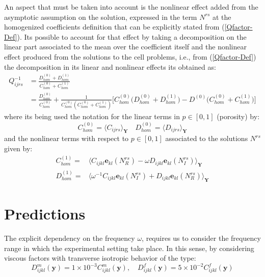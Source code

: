 An aspect that must be taken into account is the nonlinear effect added from the asymptotic assumption on the solution, expressed in the term $N^{rs}$ at the homogenized coefficients definition that can be explicitly stated from (\ref{Qfactor-Def}).
Its possible to account for that effect by taking a decomposition on the linear part associated to the mean over the coefficient itself and the nonlinear effect produced from the solutions to the cell problems, i.e., from (\ref{Qfactor-Def}) the decomposition in its linear and nonlinear effects its obtained as:
\begin{equation}
    \label{Expansion-Qfactor}
    \begin{aligned}
        Q_{ijrs}^{-1}  & = \frac{D_{hom}^{(0)} + D_{hom}^{(1)}}{C_{hom}^{(0)} + C_{hom}^{(1)}}  \\
         & =  \frac{D_{hom}^{(0)}}{C_{hom}^{(0)}} + \frac{1}{C^{(0)}_{hom}\left( C^{(0)}_{hom} + C^{(1)}_{hom} \right)} \big[C^{(0)}_{hom} \big( D^{(0)}_{hom} + D^{(1)}_{hom}\big) - D^{(0)}\big( C^{(0)}_{hom} + C^{(1)}_{hom} \big) \big]
    \end{aligned}
\end{equation}
where its being used the notation for the linear terms in $p \in [0,1]$ (porosity) by:
\begin{equation*}
    C^{(0)}_{hom} = \langle C_{ijrs} \rangle_{\mathbf{Y}} \quad  D^{(0)}_{hom} = \langle D_{ijrs} \rangle_{\mathbf{Y}}
\end{equation*}
and the nonlinear terms with respect to $p \in [0,1]$ associated to the solutions $N^{rs}$ given by:
\begin{equation*}
    \begin{array}{cc}
        C^{(1)}_{hom} =& \langle C_{ijkl}\mathbf{e}_{kl}(N^{rs}_R) - \omega D_{ijkl}\mathbf{e}_{kl}(N^{rs}_I) \rangle_{\mathbf{Y}} \\
        D^{(1)}_{hom} =& \langle \omega^{-1} C_{ijkl}\mathbf{e}_{kl}(N^{rs}_I) + D_{ijkl}\mathbf{e}_{kl}(N^{rs}_R) \rangle_{\mathbf{Y}} 
    \end{array}
\end{equation*}

\section{Predictions}

The explicit dependency on the frequency $\omega$, requires us to consider the frequency range in which the experimental setting take place. In this sense, by considering viscous factors with transverse isotropic behavior of the type:
\begin{equation*}
    D^m_{ijkl} (\mathbf{y}) = 1\times10^{-3} C^{m}_{ijkl}(\mathbf{y}), \quad D^f_{ijkl}(\mathbf{y}) = 5 \times 10^{-2} C^{f}_{ijkl}(\mathbf{y})
\end{equation*}

